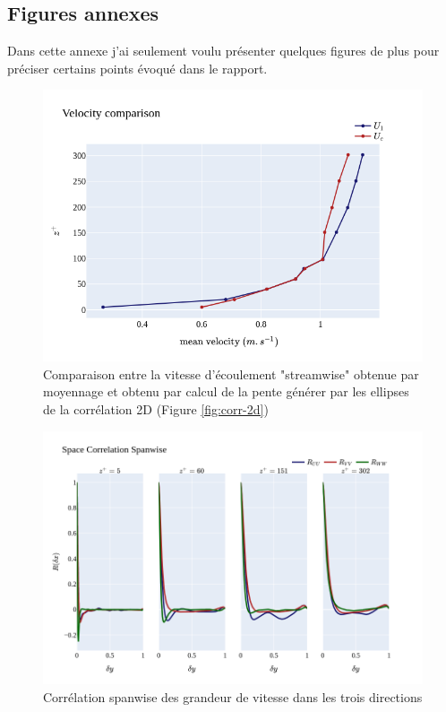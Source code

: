 \documentclass[12pt]{article}   %
\theoremstyle{plain}
\theoremstyle{remark}
\begin{document}
\subsection{Figures annexes}

Dans cette annexe j'ai seulement voulu présenter quelques figures de plus pour préciser certains points évoqué dans le rapport.

\begin{figure}[H]
	\begin{center}
		\includegraphics[width=0.8\linewidth]{../../output/figures/channel_wrles_retau395/split_time/frozen_turbulence/correlation2D/u_1c_all.png}
		\caption{Comparaison entre la vitesse d'écoulement "streamwise" obtenue par moyennage et obtenu par calcul de la pente générer par les ellipses de la corrélation 2D (Figure \ref{fig:corr-2d})}
		\label{fig:comp_u1_uc}
	\end{center}
\end{figure}

\begin{figure}[H]
	\begin{center}
		\includegraphics[width=0.9\linewidth]{../../output/figures/channel_wrles_retau395/split_time/space_correlation/spanwise.png}
		\caption{Corrélation spanwise des grandeur de vitesse dans les trois directions}
		\label{fig:space_spectra_spanwise}
	\end{center}
\end{figure}
\end{document}
